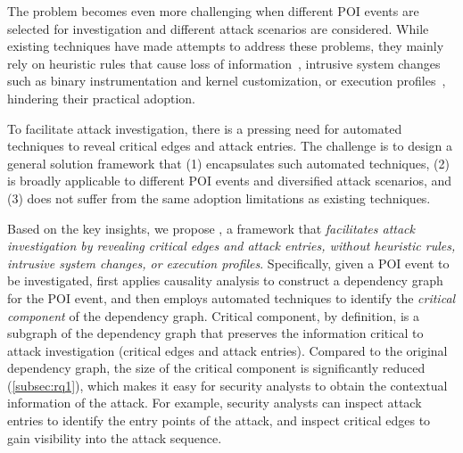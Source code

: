 The problem becomes even more challenging when different POI events are selected for investigation and different attack scenarios are considered. 
While existing techniques have made attempts to address these problems, they mainly rely on heuristic rules that cause loss of information~\cite{backtracking}, intrusive system changes~\cite{ma2016protracer,mcitracking} such as binary instrumentation and kernel customization, or execution profiles~\cite{hassan2019nodoze}, hindering their practical adoption.

To facilitate attack investigation, there is a pressing need for automated techniques
to reveal critical edges and attack entries.
The challenge is to design a general solution framework that (1) encapsulates such automated techniques, (2) is broadly applicable to different POI events and diversified attack scenarios, and (3) does not suffer from the same adoption limitations as existing techniques.



Based on the key insights, we propose \tool, a framework that \emph{facilitates attack investigation by revealing critical edges and attack entries, without heuristic rules, intrusive system changes, or execution profiles}.
Specifically, given a POI event to be investigated, 
\tool first applies causality analysis to construct a dependency graph for the POI event, and then employs automated techniques to identify the \emph{critical component} of the dependency graph.
Critical component, by definition, is a subgraph of the dependency graph that preserves the information critical to attack investigation (\ie critical edges and attack entries).
Compared to the original dependency graph, the size of the critical component is significantly reduced (\cref{subsec:rq1}), which makes it easy for security analysts to obtain the contextual information of the attack.
For example, security analysts can inspect attack entries to identify the entry points of the attack, and inspect critical edges to gain visibility into the attack sequence.

